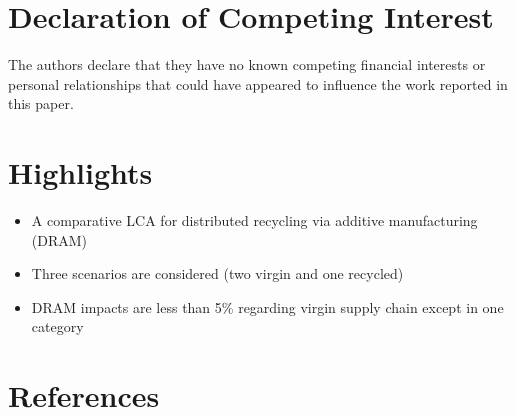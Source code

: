 \documentclass[12pt]{elsarticle} %
\providecommand{\tightlist}{%
  \setlength{\itemsep}{0pt}\setlength{\parskip}{0pt}}
\begin{document}
\hypertarget{declaration-of-competing-interest}{%
\section*{Declaration of Competing Interest}\label{declaration-of-competing-interest}}

The authors declare that they have no known competing financial
interests or personal relationships that could have appeared to influence the work reported in this paper.

\hypertarget{highlights}{%
\section*{Highlights}\label{highlights}}

\begin{itemize}
\tightlist
\item
  A comparative LCA for distributed recycling via additive manufacturing (DRAM)
\item
  Three scenarios are considered (two virgin and one recycled)
\item
  DRAM impacts are less than 5\% regarding virgin supply chain except in one category
\end{itemize}

\newpage

\hypertarget{references}{%
\section*{References}\label{references}}
\end{document}
